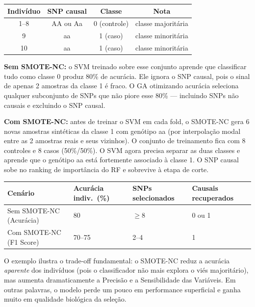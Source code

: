 \documentclass[
    12pt,
    a4paper,
    oneside,
    english,
    french,
    spanish,
    brazil
    ]{abntex2}
\renewcommand{\arraystretch}{1.3}
\newcommand{\novo}[1]{\textcolor{corNova}{#1}}
\begin{document}
\begin{center}
\footnotesize
\renewcommand{\arraystretch}{1.3}
\begin{tabular}{cccc}
\hline
\textbf{Indivíduo} & \textbf{SNP causal} & \textbf{Classe} & \textbf{Nota} \\
\hline
1--8  & AA ou Aa & 0 (controle) & classe majoritária \\
9     & aa & 1 (caso) & classe minoritária \\
10    & aa & 1 (caso) & classe minoritária \\
\hline
\end{tabular}
\end{center}

\novo{\textbf{Sem SMOTE-NC:} o SVM treinado sobre esse conjunto aprende que classificar tudo como classe 0 produz 80\% de acurácia. Ele ignora o SNP causal, pois o sinal de apenas 2 amostras da classe 1 é fraco. O GA otimizando acurácia seleciona qualquer subconjunto de SNPs que não piore esse 80\% --- incluindo SNPs não causais e excluindo o SNP causal.}

\novo{\textbf{Com SMOTE-NC:} antes de treinar o SVM em cada fold, o SMOTE-NC gera 6 novas amostras sintéticas da classe 1 com genótipo aa (por interpolação modal entre as 2 amostras reais e seus vizinhos). O conjunto de treinamento fica com 8 controles e 8 casos (50\%/50\%). O SVM agora precisa separar as duas classes e aprende que o genótipo aa está fortemente associado à classe 1. O SNP causal sobe no ranking de importância do RF e sobrevive à etapa de corte.}

\begin{center}
\footnotesize
\renewcommand{\arraystretch}{1.4}
\setlength{\tabcolsep}{5pt}
\begin{tabular}{L{4.5cm}|C{2.5cm}|C{2.5cm}|C{2.5cm}}
\hline
\textbf{Cenário} & \textbf{Acurácia indiv.\ (\%)} & \textbf{SNPs selecionados} & \textbf{Causais recuperados} \\
\hline
Sem SMOTE-NC (Acurácia) & 80 & $\geq$8 & 0 ou 1 \\
Com SMOTE-NC (F1 Score) & 70--75 & 2--4 & 1 \\
\hline
\end{tabular}
\end{center}

\novo{O exemplo ilustra o trade-off fundamental: o SMOTE-NC reduz a acurácia \emph{aparente} dos indivíduos (pois o classificador não mais explora o viés majoritário), mas aumenta dramaticamente a Precisão e a Sensibilidade das Variáveis. Em outras palavras, o modelo perde um pouco em performance superficial e ganha muito em qualidade biológica da seleção.}
\end{document}
